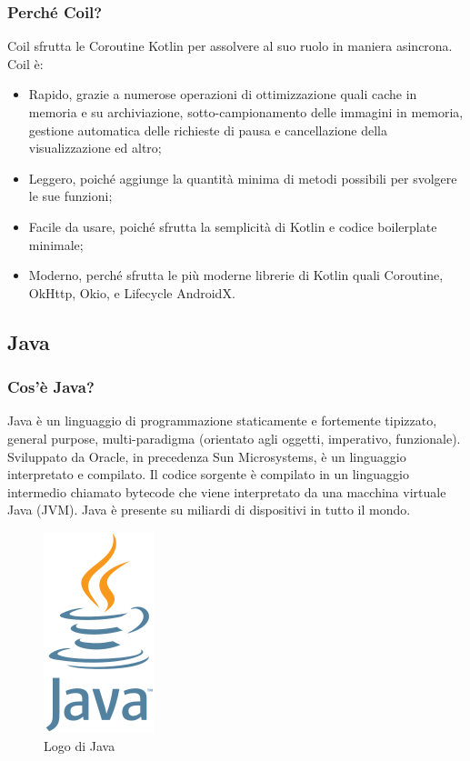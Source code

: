             \subsubsection{Perché Coil? \cite{Github1}}
                Coil sfrutta le Coroutine Kotlin per assolvere al suo ruolo in maniera asincrona. Coil è:
                \begin{itemize}
                    \item Rapido, grazie a numerose operazioni di ottimizzazione quali cache in memoria e su archiviazione, sotto-campionamento delle immagini in memoria, gestione automatica delle richieste di pausa e cancellazione della visualizzazione ed altro;
                    \item Leggero, poiché aggiunge la quantità minima di metodi possibili per svolgere le sue funzioni;
                    \item Facile da usare, poiché sfrutta la semplicità di Kotlin e codice boilerplate minimale;
                    \item Moderno, perché sfrutta le più moderne librerie di Kotlin quali Coroutine, OkHttp, Okio, e Lifecycle AndroidX.
                \end{itemize}
                
        \subsection{Java}
            \subsubsection{Cos'è Java?}
                Java è un linguaggio di programmazione staticamente e fortemente tipizzato, general purpose, multi-paradigma (orientato agli oggetti, imperativo, funzionale). Sviluppato da Oracle, in precedenza Sun Microsystems, è un linguaggio interpretato e compilato. Il codice sorgente è compilato in un linguaggio intermedio chiamato bytecode che viene interpretato da una macchina virtuale Java (JVM).  Java è presente su miliardi di dispositivi in tutto il mondo.
            \begin{figure}[htbp!]
                \centering
                \includegraphics[width=0.15\linewidth]{Immagini/System Design/Java.png}
                \caption{Logo di Java}
            \end{figure}
